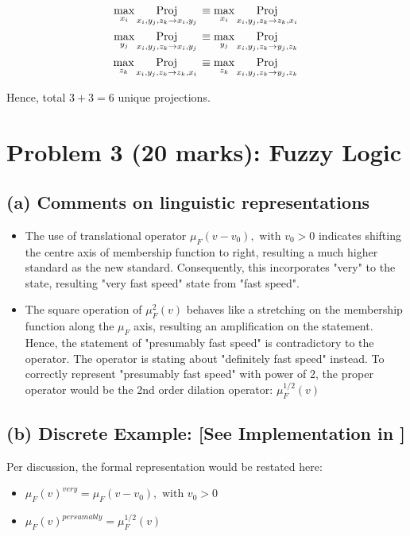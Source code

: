 \documentclass{tron}
\begin{document}
\begin{align}
	\max_{x_i} \underset{x_i,y_j,z_k \rightarrow x_i,y_j}{\mathrm{Proj}}\, & \equiv \max_{x_i} \underset{x_i,y_j,z_k \rightarrow z_k,x_i}{\mathrm{Proj}}\, \\
	\max_{y_j} \underset{x_i,y_j,z_k \rightarrow x_i,y_j}{\mathrm{Proj}}\, & \equiv \max_{y_j} \underset{x_i,y_j,z_k \rightarrow y_j,z_k}{\mathrm{Proj}}\, \\
	\max_{z_k} \underset{x_i,y_j,z_k \rightarrow z_k,x_i}{\mathrm{Proj}}\, & \equiv \max_{z_k} \underset{x_i,y_j,z_k \rightarrow y_j,z_k}{\mathrm{Proj}}\,
\end{align}

Hence, total $3+3=6$ unique projections.


\clearpage
\section{Problem 3 (20 marks): Fuzzy Logic}
\subsection{(a) Comments on linguistic representations}
\begin{itemize}
	\item The use of translational operator $\mu_F(v-v_0), \text{ with } v_0 > 0$ indicates shifting the centre axis of membership function to right, resulting a much higher standard as the new standard. Consequently, this incorporates "very" to the state, resulting "very fast speed" state from "fast speed".
	\item The square operation of $\mu_F^2 (v)$ behaves like a stretching on the membership function along the $\mu_F$ axis, resulting an amplification on the statement. Hence, the statement of "presumably fast speed" is contradictory to the operator. The operator is stating about "definitely fast speed" instead. To correctly represent "presumably fast speed" with power of 2, the proper operator would be the 2nd order dilation operator: $\mu_F^{1/2}(v)$
\end{itemize}

\subsection{(b) Discrete Example: [See Implementation in ]}
Per discussion, the formal representation would be restated here:
\begin{itemize}
	\item {} $\mu_F(v)^{very} = \mu_F(v-v_0), \text{ with } v_0 > 0$ 
	\item {} $\mu_F(v)^{persumably} = \mu_F^{1/2}(v)$
\end{itemize}
\end{document}
